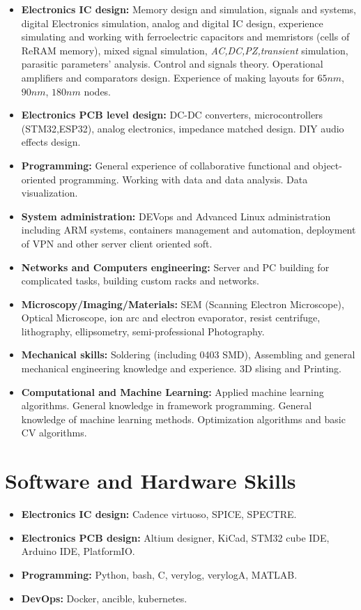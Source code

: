 \documentclass{article}
\begin{document}
\begin{itemize}
\item \textbf{Electronics IC design:} Memory design and simulation, signals and systems, digital Electronics simulation, analog and digital IC design, experience simulating and working with ferroelectric capacitors and memristors (cells of ReRAM memory),   mixed signal simulation, \textit{AC,DC,PZ,transient} simulation, parasitic parameters' analysis. Control and signals theory. Operational amplifiers and comparators design. Experience of making layouts for $65 nm$, $90nm$, $180nm$ nodes. 
\item \textbf{Electronics PCB level design:} DC-DC converters, microcontrollers (STM32,ESP32), analog electronics, impedance matched design. DIY audio effects design. 
\item \textbf{Programming:} General experience of collaborative functional and object-oriented programming. Working with data and data analysis. Data visualization.
\item \textbf{System administration:} DEVops and Advanced Linux administration including ARM systems, containers management and automation, deployment of VPN and other server client oriented soft.
\item \textbf{Networks and Computers engineering:} Server and PC building for complicated tasks, building custom racks and networks.
\item \textbf{Microscopy/Imaging/Materials:} SEM (Scanning Electron Microscope), Optical Microscope, ion arc and electron evaporator, resist centrifuge, lithography, ellipsometry, semi-professional Photography.
\item \textbf{Mechanical skills:} Soldering (including 0403 SMD), Assembling and general mechanical engineering knowledge and experience. 3D slising and Printing.
\item \textbf{Computational and Machine Learning:} Applied machine learning algorithms. General knowledge in framework programming. General knowledge of machine learning methods. Optimization algorithms and basic CV algorithms.
\end{itemize}
 
\section{Software and Hardware Skills}
\begin{itemize}
\item \textbf{Electronics IC design:} Cadence virtuoso, SPICE, SPECTRE.
\item \textbf{Electronics PCB design:} Altium designer, KiCad, STM32 cube IDE, Arduino IDE, PlatformIO.
\item \textbf{Programming:} Python, bash, C, verylog, verylogA, MATLAB.
\item \textbf{DevOps:} Docker, ancible, kubernetes.
\end{itemize}
\end{document}
